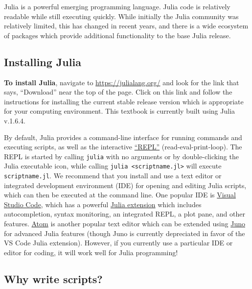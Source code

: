 \documentclass[
  11pt,
]{book}
\begin{document}
Julia is a powerful emerging programming language. Julia code is relatively readable while still executing quickly. While initially the Julia community was relatively limited, this has changed in recent years, and there is a wide ecosystem of packages which provide additional functionality to the base Julia release.

\hypertarget{installing-julia}{%
\subsection{Installing Julia}\label{installing-julia}}

\textbf{To install Julia}, navigate to \url{https://julialang.org/} and look for the link that says, \enquote{Download} near the top of the page. Click on this link and follow the instructions for installing the current stable release version which is appropriate for your computing environment. This textbook is currently built using Julia v.1.6.4.

By default, Julia provides a command-line interface for running commands and executing scripts, as well as the interactive \href{https://docs.julialang.org/en/v1/stdlib/REPL/}{\enquote{REPL}} (read-eval-print-loop). The REPL is started by calling \texttt{julia} with no arguments or by double-clicking the Julia executable icon, while calling \texttt{julia\ \textless{}scriptname.jl\textgreater{}} will execute \texttt{scriptname.jl}. We recommend that you install and use a text editor or integrated development environment (IDE) for opening and editing Julia scripts, which can then be executed at the command line. One popular IDE is \href{https://code.visualstudio.com/}{Visual Studio Code}, which has a powerful \href{https://code.visualstudio.com/docs/languages/julia}{Julia extension} which includes autocompletion, syntax monitoring, an integrated REPL, a plot pane, and other features. \href{https://atom.io/}{Atom} is another popular text editor which can be extended using \href{https://junolab.org/}{Juno} for advanced Julia features (though Juno is currently depreciated in favor of the VS Code Julia extension). However, if you currently use a particular IDE or editor for coding, it will work well for Julia programming!

\hypertarget{why-write-scripts}{%
\subsection{Why write scripts?}\label{why-write-scripts}}
\end{document}

